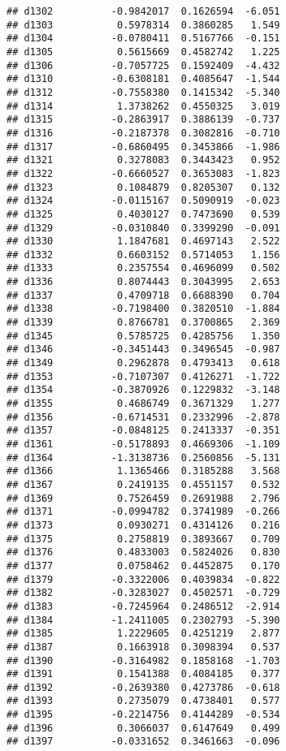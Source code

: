 \documentclass[
]{article}
\begin{document}
\begin{verbatim}
## d1302          -0.9842017  0.1626594  -6.051
## d1303           0.5978314  0.3860285   1.549
## d1304          -0.0780411  0.5167766  -0.151
## d1305           0.5615669  0.4582742   1.225
## d1306          -0.7057725  0.1592409  -4.432
## d1310          -0.6308181  0.4085647  -1.544
## d1312          -0.7558380  0.1415342  -5.340
## d1314           1.3738262  0.4550325   3.019
## d1315          -0.2863917  0.3886139  -0.737
## d1316          -0.2187378  0.3082816  -0.710
## d1317          -0.6860495  0.3453866  -1.986
## d1321           0.3278083  0.3443423   0.952
## d1322          -0.6660527  0.3653083  -1.823
## d1323           0.1084879  0.8205307   0.132
## d1324          -0.0115167  0.5090919  -0.023
## d1325           0.4030127  0.7473690   0.539
## d1329          -0.0310840  0.3399290  -0.091
## d1330           1.1847681  0.4697143   2.522
## d1332           0.6603152  0.5714053   1.156
## d1333           0.2357554  0.4696099   0.502
## d1336           0.8074443  0.3043995   2.653
## d1337           0.4709718  0.6688390   0.704
## d1338          -0.7198400  0.3820510  -1.884
## d1339           0.8766781  0.3700865   2.369
## d1345           0.5785725  0.4285756   1.350
## d1346          -0.3451443  0.3496545  -0.987
## d1349           0.2962878  0.4793413   0.618
## d1353          -0.7107307  0.4126271  -1.722
## d1354          -0.3870926  0.1229832  -3.148
## d1355           0.4686749  0.3671329   1.277
## d1356          -0.6714531  0.2332996  -2.878
## d1357          -0.0848125  0.2413337  -0.351
## d1361          -0.5178893  0.4669306  -1.109
## d1364          -1.3138736  0.2560856  -5.131
## d1366           1.1365466  0.3185288   3.568
## d1367           0.2419135  0.4551157   0.532
## d1369           0.7526459  0.2691988   2.796
## d1371          -0.0994782  0.3741989  -0.266
## d1373           0.0930271  0.4314126   0.216
## d1375           0.2758819  0.3893667   0.709
## d1376           0.4833003  0.5824026   0.830
## d1377           0.0758462  0.4452875   0.170
## d1379          -0.3322006  0.4039834  -0.822
## d1382          -0.3283027  0.4502571  -0.729
## d1383          -0.7245964  0.2486512  -2.914
## d1384          -1.2411005  0.2302793  -5.390
## d1385           1.2229605  0.4251219   2.877
## d1387           0.1663918  0.3098394   0.537
## d1390          -0.3164982  0.1858168  -1.703
## d1391           0.1541388  0.4084185   0.377
## d1392          -0.2639380  0.4273786  -0.618
## d1393           0.2735079  0.4738401   0.577
## d1395          -0.2214756  0.4144289  -0.534
## d1396           0.3066037  0.6147649   0.499
## d1397          -0.0331652  0.3461663  -0.096

\end{verbatim}
\end{document}
